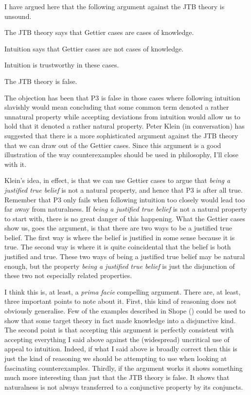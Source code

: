 \documentclass[
  11pt,
  letterpaper,
  DIV=11,
  numbers=noendperiod,
  twoside]{scrartcl}
\providecommand{\tightlist}{%
  \setlength{\itemsep}{0pt}\setlength{\parskip}{0pt}}\usepackage{longtable,booktabs,array}
\begin{document}
I have argued here that the following argument against the JTB theory is
unsound.

\begin{description}
\tightlist
\item[P1.]
The JTB theory says that Gettier cases are cases of knowledge.
\item[P2.]
Intuition says that Gettier cases are not cases of knowledge.
\item[P3.]
Intuition is trustworthy in these cases.
\item[C.]
The JTB theory is false.
\end{description}

The objection has been that P3 is false in those cases where following
intuition slavishly would mean concluding that some common term denoted
a rather unnatural property while accepting deviations from intuition
would allow us to hold that it denoted a rather natural property. Peter
Klein (in conversation) has suggested that there is a more sophisticated
argument against the JTB theory that we can draw out of the Gettier
cases. Since this argument is a good illustration of the way
counterexamples should be used in philosophy, I'll close with it.

Klein's idea, in effect, is that we can use Gettier cases to argue that
\emph{being a justified true belief} is not a natural property, and
hence that P3 is after all true. Remember that P3 only fails when
following intuition too closely would lead too far away from
naturalness. If \emph{being a justified true belief} is not a natural
property to start with, there is no great danger of this happening. What
the Gettier cases show us, goes the argument, is that there are two ways
to be a justified true belief. The first way is where the belief is
justified in some sense because it is true. The second way is where it
is quite coincidental that the belief is both justified and true. These
two ways of being a justified true belief may be natural enough, but the
property \emph{being a justified true belief} is just the disjunction of
these two not especially related properties.

I think this is, at least, a \emph{prima facie} compelling argument.
There are, at least, three important points to note about it. First,
this kind of reasoning does not obviously generalise. Few of the
examples described in Shope () could be
used to show that some target theory in fact made knowledge into a
disjunctive kind. The second point is that accepting this argument is
perfectly consistent with accepting everything I said above against the
(widespread) uncritical use of appeal to intuition. Indeed, if what I
said above is broadly correct then this is just the kind of reasoning we
should be attempting to use when looking at fascinating counterexamples.
Thirdly, if the argument works it shows something much more interesting
than just that the JTB theory is false. It shows that naturalness is not
always transferred to a conjunctive property by its conjuncts.
\end{document}
